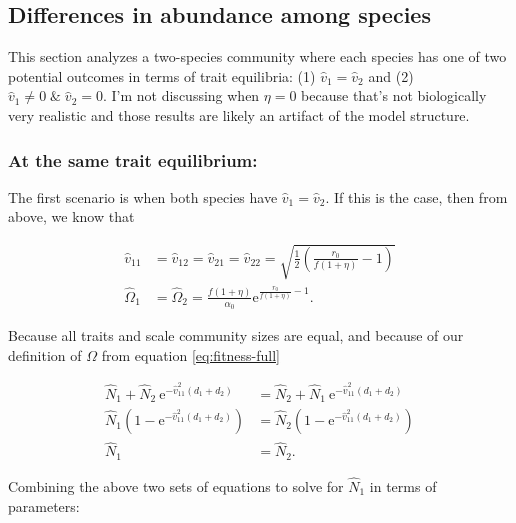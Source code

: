 \subsection*{Differences in abundance among species}



This section analyzes a two-species community where each species has one of two potential
outcomes in terms of trait equilibria:
(1) $\hat{v}_1 = \hat{v}_2$ and
(2) $\hat{v}_1 \ne 0 \; \& \; \hat{v}_2 = 0$.
I'm not discussing when $\eta = 0$ because that's not biologically very realistic
and those results are likely an artifact of the model structure.


\subsubsection*{At the same trait equilibrium:}

The first scenario is when both species have $\hat{v}_1 = \hat{v}_2$.
If this is the case, then from above, we know that

\begin{equation*}
\begin{split}
    \hat{v}_{11} &= \hat{v}_{12} = \hat{v}_{21} = \hat{v}_{22} = \sqrt{\frac{1}{2}
        \left( \frac{r_0}{f (1 + \eta)} - 1 \right)} \\
    \hat\Omega_1 &= \hat\Omega_2 = \frac{f (1 + \eta)}{\alpha_0}
        \text{e}^{\frac{r_0}{f (1 + \eta)} - 1}
    \text{.}
\end{split}
\end{equation*}

Because all traits and scale community sizes are equal, and because of our
definition of $\Omega$ from equation \ref{eq:fitness-full}

\begin{equation} \label{eq:two-traits-v1-v2-equal-N1-N2}
\begin{split}
    \hat{N}_1 + \hat{N}_2 \: \text{e}^{-\hat{v}_{11}^2 (d_1 + d_2)} &=
        \hat{N}_2 + \hat{N}_1 \: \text{e}^{-\hat{v}_{11}^2 (d_1 + d_2)} \\
    \hat{N}_1 \left( 1 - \text{e}^{-\hat{v}_{11}^2 (d_1 + d_2)} \right) &=
        \hat{N}_2 \left( 1 - \text{e}^{-\hat{v}_{11}^2 (d_1 + d_2)} \right) \\
    \hat{N}_1 &= \hat{N}_2
    \text{.}
\end{split}
\end{equation}

\noindent Combining the above two sets of equations to solve for $\hat{N}_1$ in
terms of parameters:


